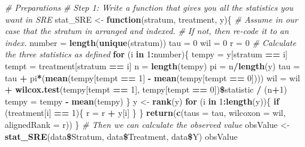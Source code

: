 \documentclass[]{article}
\newenvironment{Shaded}{\begin{snugshade}}{\end{snugshade}}
\newcommand{\KeywordTok}[1]{\textcolor[rgb]{0.13,0.29,0.53}{\textbf{#1}}}
\newcommand{\DataTypeTok}[1]{\textcolor[rgb]{0.13,0.29,0.53}{#1}}
\newcommand{\DecValTok}[1]{\textcolor[rgb]{0.00,0.00,0.81}{#1}}
\newcommand{\StringTok}[1]{\textcolor[rgb]{0.31,0.60,0.02}{#1}}
\newcommand{\CommentTok}[1]{\textcolor[rgb]{0.56,0.35,0.01}{\textit{#1}}}
\newcommand{\ControlFlowTok}[1]{\textcolor[rgb]{0.13,0.29,0.53}{\textbf{#1}}}
\newcommand{\OperatorTok}[1]{\textcolor[rgb]{0.81,0.36,0.00}{\textbf{#1}}}
\newcommand{\NormalTok}[1]{#1}
\begin{document}
\begin{Shaded}
\begin{Highlighting}[]
\CommentTok{# Preparations}
\CommentTok{# Step 1: Write a function that gives you all the statistics you want in SRE}
\NormalTok{stat_SRE <-}\StringTok{ }\ControlFlowTok{function}\NormalTok{(stratum, treatment, y)\{}
  \CommentTok{# Assume in our case that the stratum in arranged and indexed.}
  \CommentTok{# If not, then re-code it to an index.}
\NormalTok{  number =}\StringTok{ }\KeywordTok{length}\NormalTok{(}\KeywordTok{unique}\NormalTok{(stratum))}
\NormalTok{  tau =}\StringTok{ }\DecValTok{0}
\NormalTok{  wil =}\StringTok{ }\DecValTok{0}
\NormalTok{  r =}\StringTok{ }\DecValTok{0}
  \CommentTok{# Calculate the three statistics as defined}
  \ControlFlowTok{for}\NormalTok{ (i }\ControlFlowTok{in} \DecValTok{1}\OperatorTok{:}\NormalTok{number)\{}
\NormalTok{    tempy =}\StringTok{ }\NormalTok{y[stratum }\OperatorTok{==}\StringTok{ }\NormalTok{i]}
\NormalTok{    tempt =}\StringTok{ }\NormalTok{treatment[stratum }\OperatorTok{==}\StringTok{ }\NormalTok{i]}
\NormalTok{    n =}\StringTok{ }\KeywordTok{length}\NormalTok{(tempy)}
\NormalTok{    pi =}\StringTok{ }\NormalTok{n}\OperatorTok{/}\KeywordTok{length}\NormalTok{(y)}
\NormalTok{    tau =}\StringTok{ }\NormalTok{tau }\OperatorTok{+}\StringTok{ }\NormalTok{pi}\OperatorTok{*}\NormalTok{(}\KeywordTok{mean}\NormalTok{(tempy[tempt }\OperatorTok{==}\StringTok{ }\DecValTok{1}\NormalTok{] }\OperatorTok{-}\StringTok{ }\KeywordTok{mean}\NormalTok{(tempy[tempt }\OperatorTok{==}\StringTok{ }\DecValTok{0}\NormalTok{])))}
\NormalTok{    wil =}\StringTok{ }\NormalTok{wil }\OperatorTok{+}\StringTok{ }\KeywordTok{wilcox.test}\NormalTok{(tempy[tempt }\OperatorTok{==}\StringTok{ }\DecValTok{1}\NormalTok{], tempy[tempt }\OperatorTok{==}\StringTok{ }\DecValTok{0}\NormalTok{])}\OperatorTok{\$}\NormalTok{statistic }\OperatorTok{/}\StringTok{ }\NormalTok{(n}\OperatorTok{+}\DecValTok{1}\NormalTok{)}
\NormalTok{    tempy =}\StringTok{ }\NormalTok{tempy }\OperatorTok{-}\StringTok{ }\KeywordTok{mean}\NormalTok{(tempy)}
\NormalTok{  \}}
\NormalTok{  y <-}\StringTok{ }\KeywordTok{rank}\NormalTok{(y)}
  \ControlFlowTok{for}\NormalTok{ (i }\ControlFlowTok{in} \DecValTok{1}\OperatorTok{:}\KeywordTok{length}\NormalTok{(y))\{}
    \ControlFlowTok{if}\NormalTok{ (treatment[i] }\OperatorTok{==}\StringTok{ }\DecValTok{1}\NormalTok{)\{}
\NormalTok{      r =}\StringTok{ }\NormalTok{r }\OperatorTok{+}\StringTok{ }\NormalTok{y[i]}
\NormalTok{    \}}
\NormalTok{  \}}
  \KeywordTok{return}\NormalTok{(}\KeywordTok{c}\NormalTok{(}\DataTypeTok{taus =}\NormalTok{ tau, }\DataTypeTok{wilcoxon =}\NormalTok{ wil, }\DataTypeTok{alignedRank =}\NormalTok{ r))}
\NormalTok{\}}
\CommentTok{# Then we can calculate the observed value}
\NormalTok{obsValue <-}\StringTok{ }\KeywordTok{stat_SRE}\NormalTok{(data}\OperatorTok{\$}\NormalTok{Stratum, data}\OperatorTok{\$}\NormalTok{Treatment, data}\OperatorTok{\$}\NormalTok{Y)}
\NormalTok{obsValue}
\end{Highlighting}
\end{Shaded}
\end{document}
